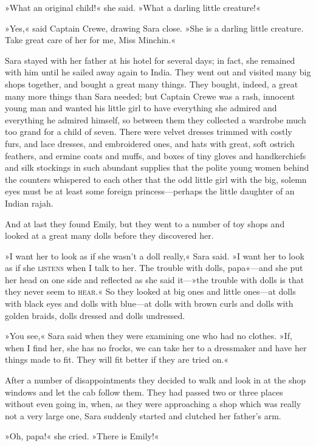 »What an original child!« she said. »What a darling little creature!«

»Yes,« said Captain Crewe, drawing Sara close. »She is a darling little creature. Take great care of her for me, Miss Minchin.«

Sara stayed with her father at his hotel for several days; in fact, she remained with him until he sailed away again to India. They went out and visited many big shops together, and bought a great many things. They bought, indeed, a great many more things than Sara needed; but Captain Crewe was a rash, innocent young man and wanted his little girl to have everything she admired and everything he admired himself, so between them they collected a wardrobe much too grand for a child of seven. There were velvet dresses trimmed with costly furs, and lace dresses, and embroidered ones, and hats with great, soft ostrich feathers, and ermine coats and muffs, and boxes of tiny gloves and handkerchiefs and silk stockings in such abundant supplies that the polite young women behind the counters whispered to each other that the odd little girl with the big, solemn eyes must be at least some foreign princess—perhaps the little daughter of an Indian rajah.

And at last they found Emily, but they went to a number of toy shops and looked at a great many dolls before they discovered her.

»I want her to look as if she wasn't a doll really,« Sara said. »I want her to look as if she \textsc{listens} when I talk to her. The trouble with dolls, papa«—and she put her head on one side and reflected as she said it—»the trouble with dolls is that they never seem to \textsc{hear}.« So they looked at big ones and little ones—at dolls with black eyes and dolls with blue—at dolls with brown curls and dolls with golden braids, dolls dressed and dolls undressed.

»You see,« Sara said when they were examining one who had no clothes. »If, when I find her, she has no frocks, we can take her to a dressmaker and have her things made to fit. They will fit better if they are tried on.«

After a number of disappointments they decided to walk and look in at the shop windows and let the cab follow them. They had passed two or three places without even going in, when, as they were approaching a shop which was really not a very large one, Sara suddenly started and clutched her father's arm.

»Oh, papa!« she cried. »There is Emily!«

